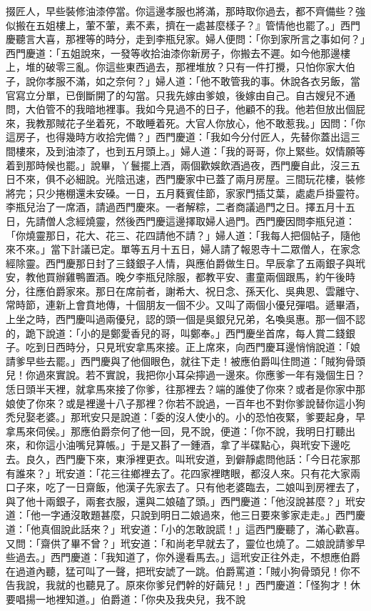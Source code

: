 掇匠人，早些裝修油漆停當。你這邊孝服也將滿，那時取你過去，都不齊備些？強似搬在五姐樓上，葷不葷，素不素，擠在一處甚麼樣子？』管情他也罷了。」西門慶聽言大喜，那裡等的時分，走到李瓶兒家。婦人便問：「你到家所言之事如何？」西門慶道：「五姐說來，一發等收拾油漆你新房子，你搬去不遲。如今他那邊樓上，堆的破零三亂。你這些東西過去，那裡堆放？只有一件打攪，只怕你家大伯子，說你孝服不滿，如之奈何？」婦人道：「他不敢管我的事。休說各衣另飯，當官寫立分單，已倒斷開了的勾當。只我先嫁由爹娘，後嫁由自己。自古嫂兒不通問，大伯管不的我暗地裡事。我如今見過不的日子，他顧不的我。他若但放出個屁來，我教那賊花子坐着死，不敢睡着死。大官人你放心，他不敢惹我。」因問：「你這房子，也得幾時方收拾完備？」西門慶道：「我如今分付匠人，先替你蓋出這三間樓來，及到油漆了，也到五月頭上。」婦人道：「我的哥哥，你上緊些。奴情願等着到那時候也罷。」說畢，丫鬟擺上酒，兩個歡娛飲酒過夜，西門慶自此，沒三五日不來，俱不必細說。光陰迅速，西門慶家中已蓋了兩月房屋。三間玩花樓，裝修將完；只少捲棚還未安磉。一日，五月蕤賓佳節，家家門插艾葉，處處戶掛靈符。李瓶兒治了一席酒，請過西門慶來。一者解粽，二者商議過門之日。擇五月十五日，先請僧人念經燒靈，然後西門慶這邊擇取婦人過門。西門慶因問李瓶兒道：「你燒靈那日，花大、花三、花四請他不請？」婦人道：「我每人把個帖子，隨他來不來。」當下計議已定。單等五月十五日，婦人請了報恩寺十二眾僧人，在家念經除靈。西門慶那日封了三錢銀子人情，與應伯爵做生日。早辰拿了五兩銀子與玳安，教他買辦雞鴨置酒。晚夕李瓶兒除服，都教平安、畫童兩個跟馬，約午後時分，往應伯爵家來。那日在席前者，謝希大、祝日念、孫天化、吳典恩、雲離守、常時節，連新上會賁地傳，十個朋友一個不少。又叫了兩個小優兒彈唱。遞畢酒，上坐之時，西門慶叫過兩優兒，認的頭一個是吳銀兒兄弟，名喚吳惠。那一個不認的，跪下說道：「小的是鄭愛香兒的哥，叫鄭奉。」西門慶坐首席，每人賞二錢銀子。吃到日西時分，只見玳安拿馬來接。正上席來，向西門慶耳邊悄悄說道：「娘請爹早些去罷。」西門慶與了他個眼色，就往下走！被應伯爵叫住問道：「賊狗骨頭兒！你過來實說。若不實說，我把你小耳朵擰過一邊來。你應爹一年有幾個生日？恁日頭半天裡，就拿馬來接了你爹，往那裡去？端的誰使了你來？或者是你家中那娘使了你來？或是裡邊十八子那裡？你若不說過，一百年也不對你爹說替你這小狗禿兒娶老婆。」那玳安只是說道：「委的沒人使小的。小的恐怕夜緊，爹要起身，早拿馬來伺侯。」那應伯爵奈何了他一回，見不說，便道：「你不說，我明日打聽出來，和你這小油嘴兒算帳。」于是又斟了一鍾酒，拿了半碟點心，與玳安下邊吃去。良久，西門慶下來，東淨裡更衣。叫玳安道，到僻靜處問他話：「今日花家那有誰來？」玳安道：「花三往鄉裡去了。花四家裡瞎眼，都沒人來。只有花大家兩口子來，吃了一日齋飯，他漢子先家去了。只有他老婆臨去，二娘叫到房裡去了，與了他十兩銀子，兩套衣服，還與二娘磕了頭。」西門慶道：「他沒說甚麼？」玳安道：「他一字通沒敢題甚麼，只說到明日二娘過來，他三日要來爹家走走。」西門慶道：「他真個說此話來？」玳安道：「小的怎敢說謊！」這西門慶聽了，滿心歡喜。又問：「齋供了畢不曾？」玳安道：「和尚老早就去了，靈位也燒了。二娘說請爹早些過去。」西門慶道：「我知道了，你外邊看馬去。」這玳安正往外走，不想應伯爵在過道內聽，猛可叫了一聲，把玳安諕了一跳。伯爵罵道：「賊小狗骨頭兒！你不告我說，我就的也聽見了。原來你爹兒們幹的好繭兒！」西門慶道：「怪狗才！休要唱揚一地裡知道。」伯爵道：「你央及我央兒，我不說